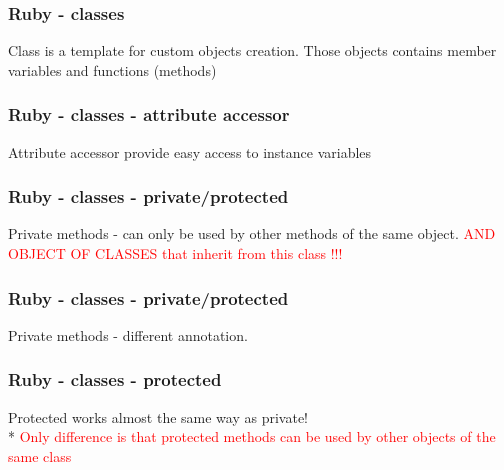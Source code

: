 \documentclass{beamer}
\theoremstyle{mystyle}
\begin{document}
\begin{frame}
  \frametitle{Ruby - classes}
  \begin{definition}[Class]
    Class is a template for custom objects creation. Those objects contains
    member variables and functions (methods)
  \end{definition}
  \classexample
  
\end{frame}

\begin{frame}
  \frametitle{Ruby - classes - attribute accessor}
  \begin{definition}
    Attribute accessor provide easy access to instance variables
  \end{definition}
  \classexampleII
\end{frame}

\begin{frame}
  \frametitle{Ruby - classes - private/protected}
  \begin{definition}
    Private methods - can only be used by other methods of the same object.
    \textcolor{red}{AND OBJECT OF CLASSES that inherit from this class !!!}
  \end{definition}

  \classexampleprivateI

\end{frame}

\begin{frame}
  \frametitle{Ruby - classes - private/protected}
  \begin{definition}
    Private methods - different annotation.
  \end{definition}

  \classexampleprivateII

\end{frame}

\begin{frame}
  \frametitle{Ruby - classes - protected}
  \begin{definition}[Protected]
    Protected works almost the same way as private!\\*
    \textcolor{red}{Only difference is that protected methods can be used by other objects of the same class}
  \end{definition}
  
  \classexampleprotected
\end{frame}
\end{document}
